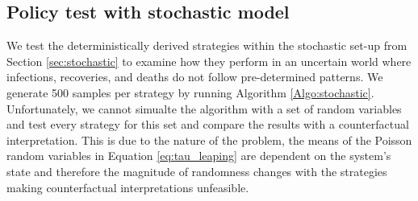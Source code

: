 \clearpage
\subsection{Policy test with stochastic model}
We test the deterministically derived strategies within the stochastic set-up from Section \ref{sec:stochastic} to examine how they perform in an uncertain world where infections, recoveries, and deaths do not follow pre-determined patterns. We generate 500 samples per strategy by running Algorithm \ref{Algo:stochastic}. Unfortunately, we cannot simualte the algorithm with a set of random variables and test every strategy for this set and compare the results with a counterfactual interpretation. This is due to the nature of the problem, the means of the Poisson random variables in Equation \eqref{eq:tau_leaping} are dependent on the system's state and therefore the magnitude of randomness changes with the strategies making counterfactual interpretations unfeasible.  \\ 

